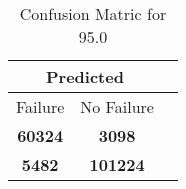 \begin{table}[] 
\caption{Confusion Matric for 95.0} 
\label{Table: Prediction Accuracy-None95.0DecisionTrees100EKF-ignoresolarPanelDipole-solarPanelDipole} 
\centering 
\begin{tabular} 
 {@{}ccc@{}} 
\toprule 
\multicolumn{2}{c}{\textbf{Predicted}}
 \\ \midrule 
\multicolumn{1}{|c|}{Failure} & 
\multicolumn{1}{c|}{No Failure}
 \\ \midrule 
\multicolumn{1}{|c|}{\color{green}\textbf{60324}} & 
\multicolumn{1}{c|}{\color{red}\textbf{3098}}
 \\ \midrule 
\multicolumn{1}{|c|}{\color{red}\textbf{5482}} & 
\multicolumn{1}{c|}{\color{green}\textbf{101224}}
 \\ \bottomrule 
\end{tabular} 
\end{table} 
